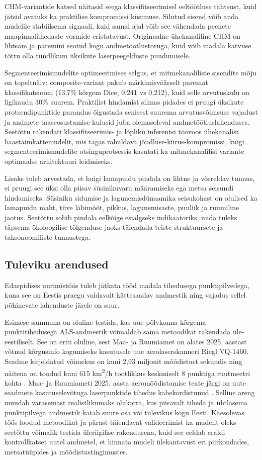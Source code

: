 CHM-variantide katsed näitasid seega klassifitseerimisel eeltöötluse tähtsust, kuid jätsid avatuks ka praktilise kompromissi küsimuse. Silutud sisend võib anda mudelile stabiilsema signaali, kuid samal ajal võib see vähendada peenete maapinnalähedaste vormide eristatavust. Originaalne ühekanaliline CHM on lihtsam ja paremini seotud kogu andmetöötlustoruga, kuid võib madala katvuse tõttu olla tundlikum üksikute laserpeegelduste puudumisele.

Segmenteerimismudelite optimeerimises selgus, et mitmekanaliliste sisendite mõju on topeltnäiv: composite-variant pakub märkimisväärselt paremat klassifikatsiooni (13,7\% kõrgem Dice, 0,241 vs 0,212), kuid selle arvutuskulu on ligikaudu 30\% suurem. Praktilist hindamist silmas pidades ei pruugi üksikute protsendipunktide parandus õigustada senisest suurema arvutusvõimsuse vajadust ja andmete taaseosustamise kulusid juba olemasoleval andmetöötluslahenduses. Seetõttu rakendati klassifitseerimis- ja lõpliku inferentsi töövoos ühekanalist baastaimkattemudelit, mis tagas rahuldava jõudluse-kiirus-kompromissi, kuigi segmenteerimismudelite otsinguprotsessis kasutati ka mitmekanalilisi variante optimaalse arhitektuuri leidmiseks.

Lisaks tuleb arvestada, et kuigi lamapuidu pindala on lihtne ja võrreldav tunnus, ei pruugi see üksi olla piisav süsinikuvaru määramiseks ega metsa seisundi hindamiseks. Süsiniku sidumise ja lagunemisdünaamika seisukohast on olulised ka lamapuidu maht, tüve läbimõõt, pikkus, lagunemisaste, puuliik ja ruumiline jaotus. Seetõttu sobib pindala eelkõige esialgseks indikaatoriks, mida tuleks täpsema ökoloogilise tõlgenduse jaoks täiendada teiste struktuursete ja taksonoomiliste tunnustega.

\subsection{Tuleviku arendused}
Edaspidises uurimistöös tuleb jätkata tööd madala tihedusega punktipilvedega, kuna see on Eestis praegu valdavalt kättesaadav andmestik ning vajadus sellel põhinevate lahenduste järele on suur.

Esimese sammuna on oluline testida, kas uue põlvkonna kõrgema punktitihedusega ALS-andmestik võimaldab sama metoodikat rakendada üle-eestiliselt. See on eriti oluline, sest Maa- ja Ruumiamet on alates 2025. aastast võtnud kõrgusinfo kogumiseks kasutusele uue aerolaserskanneri Riegl VQ-1460. Seadme kirjeldatud võimekus on kuni 2,93 miljonit mõõdistust sekundis ning näitena on toodud kuni 615 km\textsuperscript{2}/h tootlikkus keskmiselt 8 punktiga ruutmeetri kohta \parencite{maa-_ja_ruumiamet_maa-_nodate}. Maa- ja Ruumiameti 2025. aasta aeromõõdistamise teate järgi on uute seadmete kasutuselevõtuga laserpunktide tihedus kahekordistunud \parencite{maa-_ja_ruumiamet_maa-_2025}. Selline areng muudab varasemast realistlikumaks olukorra, kus piisavalt tiheda ja ühtlasema punktipilvega andmestik katab suure osa või tulevikus kogu Eesti. Käesolevas töös loodud metoodikat ja pärast täiendavat valideerimist ka mudelit oleks seetõttu võimalik testida üleriigilise rakendusena, kuid see eeldab eraldi kontrollkatset uutel andmetel, et hinnata mudeli ülekantavust eri piirkondades, metsatüüpides ja mõõdistustingimustes.

